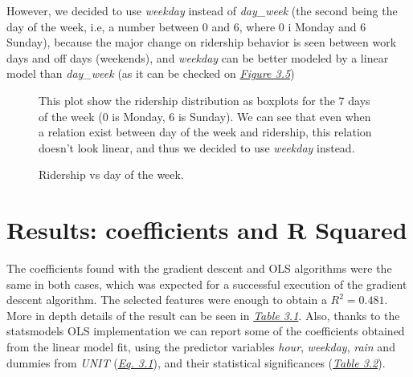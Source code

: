 \documentclass[a4paper,12pt,english]{sphinxmanual}
\begin{document}
However, we decided to use \emph{weekday} instead of \emph{day\_week} (the second being the
day of the week, i.e, a number between 0 and 6, where 0 i Monday and 6 Sunday),
because the major change on ridership behavior is seen between work days and
off days (weekends), and \emph{weekday} can be better modeled by a linear model than
\emph{day\_week} (as it can be checked on {\hyperref[section2:figure35]{\emph{Figure 3.5}}})
\begin{figure}[htbp]
\centering
\capstart

\caption{Ridership vs day of the week.}{\small 
This plot show the ridership distribution as boxplots for the 7 days of the
week (0 is Monday, 6 is Sunday). We can see that even when a relation
exist between day of the week and ridership, this relation doesn't look
linear, and thus we decided to use \emph{weekday} instead.
}\label{section2:figure35}\end{figure}


\section{Results: coefficients and R Squared}
\label{section2:results-coefficients-and-r-squared}
The coefficients found with the gradient descent and OLS algorithms were the
same in both cases, which was expected for a successful execution of the
gradient descent algorithm. The selected features were enough to obtain a
\(R^2 = 0.481\). More in depth details of the result can be seen in
{\hyperref[section2:table31]{\emph{Table 3.1}}}. Also, thanks to the statsmodels OLS implementation
we can report some of the coefficients obtained from the linear model fit,
using the predictor variables \emph{hour}, \emph{weekday}, \emph{rain} and dummies from \emph{UNIT}
({\hyperref[section2:multreg-mod]{\emph{Eq. 3.1}}}), and their statistical significances
({\hyperref[section2:table32]{\emph{Table 3.2}}}).
\label{section2:table31}
\end{document}
